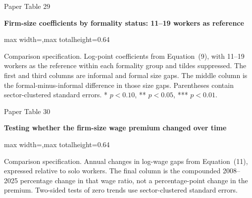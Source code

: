 \begin{frame}{Paper Table 29}
\begin{minipage}{\textwidth}\small\textbf{Firm-size coefficients by formality status: 11--19 workers as reference}\end{minipage}\par\vspace{0.15cm}
\centering\begingroup\fontsize{8.5}{10}\selectfont
\setlength{\tabcolsep}{4pt}\renewcommand{\arraystretch}{1.06}
\begin{adjustbox}{max width=\textwidth,max totalheight=0.64\textheight}

\end{adjustbox}\endgroup\par\vspace{0.10cm}
{\fontsize{6.5}{7.5}\selectfont\raggedright Comparison specification. Log-point coefficients from Equation~(9), with 11--19 workers as the reference within each formality group and tildes suppressed. The first and third columns are informal and formal size gaps. The middle column is the formal-minus-informal difference in those size gaps. Parentheses contain sector-clustered standard errors. * $p<0.10$, ** $p<0.05$, *** $p<0.01$.\par}
\end{frame}

\begin{frame}{Paper Table 30}
\begin{minipage}{\textwidth}\small\textbf{Testing whether the firm-size wage premium changed over time}\end{minipage}\par\vspace{0.15cm}
\centering\begingroup\fontsize{8.5}{10}\selectfont
\setlength{\tabcolsep}{4pt}\renewcommand{\arraystretch}{1.06}
\begin{adjustbox}{max width=\textwidth,max totalheight=0.64\textheight}

\end{adjustbox}\endgroup\par\vspace{0.10cm}
{\fontsize{6.5}{7.5}\selectfont\raggedright Comparison specification. Annual changes in log-wage gaps from Equation~(11), expressed relative to solo workers. The final column is the compounded 2008--2025 percentage change in that wage ratio, not a percentage-point change in the premium. Two-sided tests of zero trends use sector-clustered standard errors.\par}
\end{frame}

